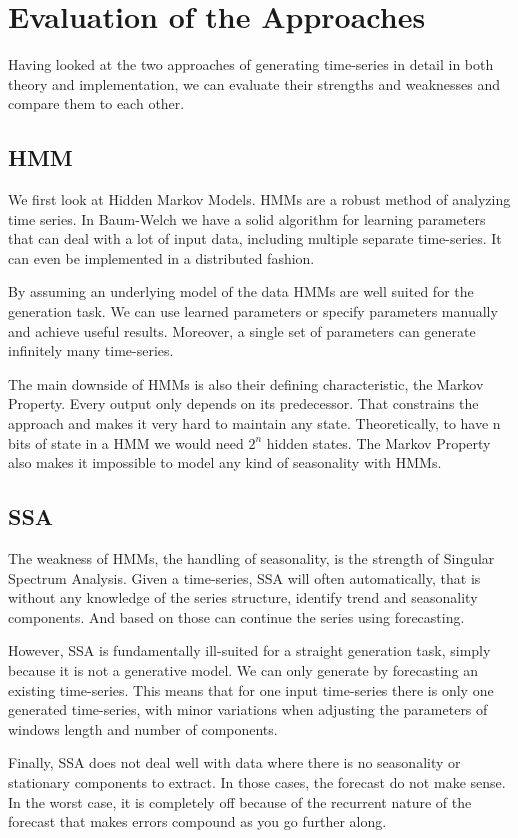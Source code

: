 
\chapter{Evaluation of the Approaches}\label{chapter:evaluation}

Having looked at the two approaches of generating time-series in detail in both theory and implementation, we can evaluate their strengths and weaknesses and compare them to each other. 

\section{HMM}

We first look at Hidden Markov Models. HMMs are a robust method of analyzing time series. In Baum-Welch we have a solid algorithm for learning parameters that can deal with a lot of input data, including multiple separate time-series. It can even be implemented in a distributed fashion. 

By assuming an underlying model of the data HMMs are well suited for the generation task. We can use learned parameters or specify parameters manually and achieve useful results. Moreover, a single set of parameters can generate infinitely many time-series. 

The main downside of HMMs is also their defining characteristic, the Markov Property. Every output only depends on its predecessor. That constrains the approach and makes it very hard to maintain any state. Theoretically, to have n bits of state in a HMM we would need $2^n$ hidden states. The Markov Property also makes it impossible to model any kind of seasonality with HMMs. 

\section{SSA}

The weakness of HMMs, the handling of seasonality, is the strength of Singular Spectrum Analysis. Given a time-series, SSA will often automatically, that is without any knowledge of the series structure, identify trend and seasonality components. And based on those can continue the series using forecasting.

However, SSA is fundamentally ill-suited for a straight generation task, simply because it is not a generative model. We can only generate by forecasting an existing time-series. This means that for one input time-series there is only one generated time-series, with minor variations when adjusting the parameters of windows length and number of components.

Finally, SSA does not deal well with data where there is no seasonality or stationary components to extract. In those cases, the forecast do not make sense. In the worst case, it is completely off because of the recurrent nature of the forecast that makes errors compound as you go further along.